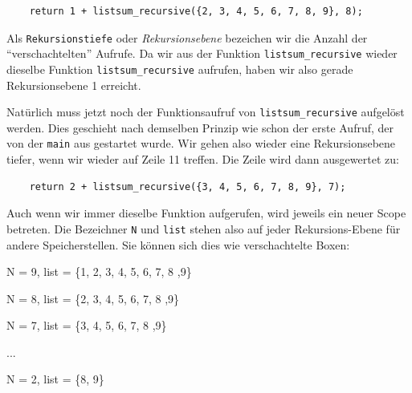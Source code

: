 \begin{codebox}
\begin{verbatim}
    return 1 + listsum_recursive({2, 3, 4, 5, 6, 7, 8, 9}, 8);
\end{verbatim}
\end{codebox}

Als \texttt{Rekursionstiefe} oder \emph{Rekursionsebene} bezeichen wir die Anzahl der \enquote{verschachtelten} Aufrufe. Da wir aus der Funktion \texttt{listsum\_recursive} wieder dieselbe Funktion \texttt{listsum\_recursive} aufrufen, haben wir also gerade Rekursionsebene 1 erreicht.

Natürlich muss jetzt noch der Funktionsaufruf von \texttt{listsum\_recursive} aufgelöst werden. Dies geschieht nach demselben Prinzip wie schon der erste Aufruf, der von der \texttt{main} aus gestartet wurde. Wir gehen also wieder eine Rekursionsebene tiefer, wenn wir wieder auf Zeile 11 treffen. Die Zeile wird dann ausgewertet zu:

\begin{codebox}
\begin{verbatim}
    return 2 + listsum_recursive({3, 4, 5, 6, 7, 8, 9}, 7);
\end{verbatim}
\end{codebox}

Auch wenn wir immer dieselbe Funktion aufgerufen, wird jeweils ein neuer Scope betreten. Die Bezeichner \texttt{N} und \texttt{list} stehen also auf jeder Rekursions-Ebene für andere Speicherstellen. Sie können sich dies wie verschachtelte Boxen:

\begin{codebox}
N = 9, list = \{1, 2, 3, 4, 5, 6, 7, 8 ,9\}
\begin{codebox}
N = 8, list = \{2, 3, 4, 5, 6, 7, 8 ,9\}
\begin{codebox}
N = 7, list = \{3, 4, 5, 6, 7, 8 ,9\}
\begin{codebox}[Rekursionsstufe 3-6]
...
\begin{codebox}
N = 2, list = \{8, 9\}
\end{codebox}
\end{codebox}
\end{codebox}
\end{codebox}
\end{codebox}

